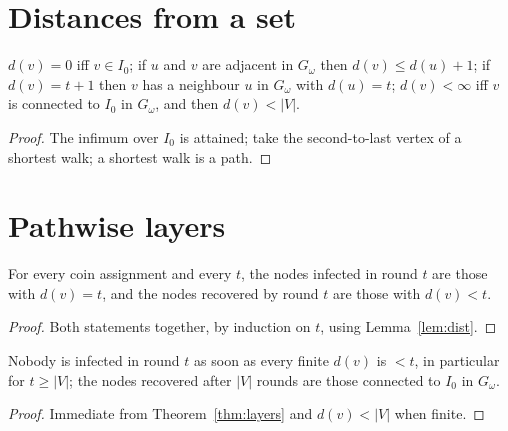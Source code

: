 \section{Distances from a set}
\begin{lemma}\label{lem:dist}
\leanok{}
$d(v)=0$ iff $v\in I_0$; if $u$ and $v$ are adjacent in $G_\omega$ then $d(v)\le d(u)+1$; if
$d(v)=t+1$ then $v$ has a neighbour $u$ in $G_\omega$ with $d(u)=t$; $d(v)<\infty$ iff $v$ is
connected to $I_0$ in $G_\omega$, and then $d(v)<|V|$.
\end{lemma}
\begin{proof}\leanok
The infimum over $I_0$ is attained; take the second-to-last vertex of a shortest walk; a shortest
walk is a path.
\end{proof}

\section{Pathwise layers}
\begin{theorem}\label{thm:layers}
\leanok{}
For every coin assignment and every $t$, the nodes infected in round $t$ are those with $d(v)=t$,
and the nodes recovered by round $t$ are those with $d(v)<t$.
\end{theorem}
\begin{proof}\leanok
Both statements together, by induction on $t$, using Lemma~\ref{lem:dist}.
\end{proof}
\begin{corollary}\label{cor:final}
\leanok{}
Nobody is infected in round $t$ as soon as every finite $d(v)$ is $<t$, in particular for
$t\ge|V|$; the nodes recovered after $|V|$ rounds are those connected to $I_0$ in $G_\omega$.
\end{corollary}
\begin{proof}\leanok
Immediate from Theorem~\ref{thm:layers} and $d(v)<|V|$ when finite.
\end{proof}

